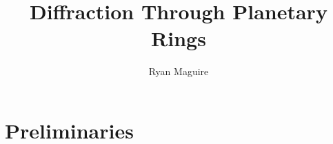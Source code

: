 \documentclass[oneside]{book}                                                 %
\begin{document}
    \title{Diffraction Through Planetary Rings}
    \author{Ryan Maguire}
    \date{\vspace{-5ex}}
    \maketitle
    \tableofcontents
    \listoffigures
    \listoftables
    \clearpage
    \clearpage
    \part{Preliminaries}
        
        
        \printglossary[style=longpara]
\end{document}
